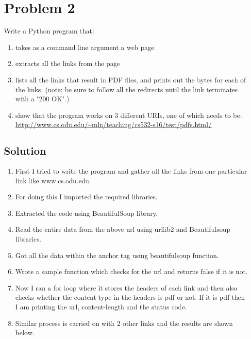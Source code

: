 
\section{Problem 2}
\label{part2}
Write a Python program that:
\begin{enumerate} 
\item takes as a command line argument a web page
\item extracts all the links from the page
\item lists all the links that result in PDF files, and prints out the bytes for each of the links.  (note: be sure to follow all the redirects until the link terminates with a "200 OK".)
\item show that the program works on 3 different URIs, one of which needs to be:\\
     \url{     http://www.cs.odu.edu/~mln/teaching/cs532-s16/test/pdfs.html/}\\
\end{enumerate}

\subsection{Solution}
\begin{enumerate}
\item First I tried to write the program and gather all the links from one particular link like www.cs.odu.edu. 
\item For doing this I imported the required libraries.
\item Extracted the code using BeautifulSoup library.
\item Read the entire data from the above url using urllib2 and Beautifulsoup libraries.
\item Got all the data within the anchor tag using beautifulsoup function.
\item Wrote a sample function which checks for the url and returns false if it is not. 
\item Now I ran a for loop where it stores the headers of each link and then also checks whether the content-type in the headers is pdf or not. If it is pdf then I am printing the url, content-length and the status code.
\item Similar process is carried on with 2 other links and the results are shown below. 
\end{enumerate}

